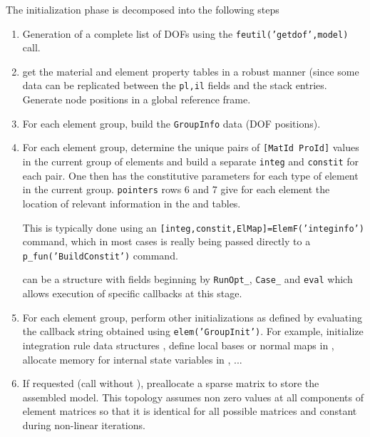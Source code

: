 The initialization phase is decomposed into the following steps

\begin{enumerate}
 \item Generation of a complete list of DOFs using the {\tt feutil('getdof',model)} call.
 \item get the material and element property tables in a robust manner (since some data can be replicated between the {\tt pl,il} fields and the  stack entries. Generate node positions in a global reference frame.

 \item For each element group, build the {\tt GroupInfo} data (DOF positions).
 \item For each element group, determine the unique pairs of {\tt [MatId ProId]} values in the current group of elements and build a separate {\tt integ} and {\tt constit} for each pair. One then has the constitutive parameters for each type of element in the current group. {\tt pointers} rows 6 and 7 give for each element the location of relevant information in the  and  tables.

This is typically done using an {\tt [integ,constit,ElMap]=ElemF('integinfo')} command, which in most cases is really being passed directly to a {\tt p\_fun('BuildConstit')} command. 

 can be a structure with fields beginning by {\tt RunOpt\_},  {\tt Case\_} and {\tt eval} which allows execution of specific callbacks at this stage.

\item For each element group, perform other initializations as defined by evaluating the callback string obtained using {\tt elem('GroupInit')}. For example, initialize integration rule data structures , define local bases or normal maps in , allocate memory for internal state variables in , ...

\item If requested (call without ), preallocate a sparse matrix to store the assembled model. This topology assumes non zero values at all components of element matrices so that it is identical for all possible matrices and constant during non-linear iterations.
 
\end{enumerate}


